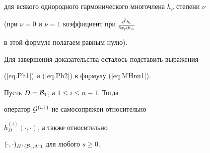 \begin{pf}
\begin{gather}
\end{gather}


для всякого однородного гармонического многочлена $h_\nu $ степени $\nu$


(при $\nu =0$ и $\nu =1$ коэффициент при $


\frac{\partial ^2 h_\nu }{\partial x_k \partial x_m}$


в этой формуле полагаем равным нулю).


Для завершения доказательства осталось подставить выражения


(\ref{eq.Ph1}) и (\ref{eq.Ph2}) в формулу (\ref{eq.MHnu1}).


\end{pf}








\begin{lem}


Пусть $D={\cal B}_1$, а $1\leq i \leq n-1$. Тогда


оператор ${\cal G}^{(i,1)}$ не самосопряжен относительно 


$h_{D}^{(i)} (\cdot,\cdot)$, а также относительно


$(\cdot,\cdot)_{H^s ({\cal B}_1,\Lambda ^i)}$ для любого $s\geq 0$.


\end{lem}








